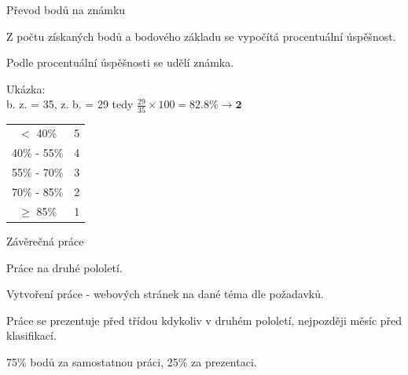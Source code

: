 \documentclass[aspectratio=169]{beamer}
\begin{document}
\begin{frame}{Převod bodů na známku}
    \begin{cardTiny}
        \begin{flushleft}
            Z počtu získaných bodů a bodového základu se vypočítá procentuální úspěšnost.

            Podle procentuální úspěšnosti se udělí známka.

            
            
            Ukázka:\\ b. z. = 35, z. b. = 29  tedy  $\frac{29}{35} \times 100 = 82.8\% \to \textbf{2}$
        \end{flushleft}
    \end{cardTiny}
    \begin{cardTiny}
        \begin{center}
            \begin{tabular}{ |c|c| } 
                \hline
                $<$ 40\% & 5 \\ 
                40\% - 55\% & 4 \\ 
                55\% - 70\% & 3 \\ 
                70\% - 85\% & 2 \\ 
                $\geq$ 85\% & 1 \\ 
                \hline
            \end{tabular}
        \end{center}
    \end{cardTiny}
\end{frame}

\begin{frame}{Závěrečná práce}
    \begin{cardTiny}
        \begin{flushleft}
            Práce na druhé pololetí.
            
            Vytvoření práce - webových stránek na dané téma dle požadavků.

            Práce se prezentuje před třídou kdykoliv v druhém pololetí, nejpozději měsíc před klasifikací.
            
            \vspace{2ex}
            75\% bodů za samostatnou práci, 25\% za prezentaci.
        \end{flushleft}
    \end{cardTiny}
\end{frame}
\end{document}
